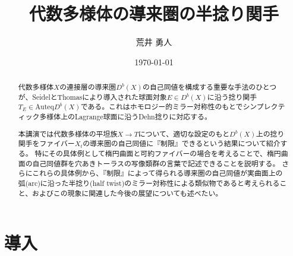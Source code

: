 \documentclass[uplatex,a4paper,dvipdfmx]{jsarticle}
\title{代数多様体の導来圏の半捻り関手}
\author{荒井 勇人}
\date{\today}
\theoremstyle{plain}
\theoremstyle{definition}
\begin{document}
\maketitle

\begin{abstract}
	代数多様体$X$の連接層の導来圏$D^b(X)$の自己同値を構成する重要な手法のひとつが、SeidelとThomasにより導入された球面対象$E \in D^b(X)$に沿う捻り関手$T_E \in \mathrm{Auteq} D^b(X)$である。これはホモロジー的ミラー対称性のもとでシンプレクティック多様体上のLagrange球面に沿うDehn捻りに対応する。

	本講演では代数多様体の平坦族$X \to T$について、適切な設定のもと$D^b(X)$上の捻り関手をファイバー$X_t$の導来圏の自己同値に『制限』できるという結果について紹介する。
	特にその具体例として楕円曲面と可約ファイバーの場合を考えることで、楕円曲面の自己同値群を穴あきトーラスの写像類群の言葉で記述できることを説明する。
	さらにこれらの具体例から、『制限』によって得られる導来圏の自己同値が実曲面上の弧(arc)に沿った半捻り(half twist)のミラー対称性による類似物であると考えられること、およびこの現象に関連した今後の展望についても述べたい。
\end{abstract}

\section{導入}
\end{document}
